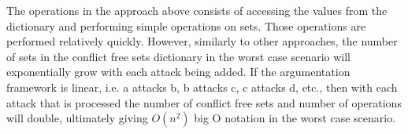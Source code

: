 
The operations in the approach above consists of accessing the values from the dictionary and performing simple operations on sets. Those operations are performed relatively quickly. However, similarly to other approaches, the number of sets in the conflict free sets dictionary in the worst case scenario will exponentially grow with each attack being added. If the argumentation framework is linear, i.e. a attacks b, b attacks c, c attacks d, etc., then with each attack that is processed the number of conflict free sets and number of operations will double, ultimately giving $O(n^2)$ big O notation in the worst case scenario. 




